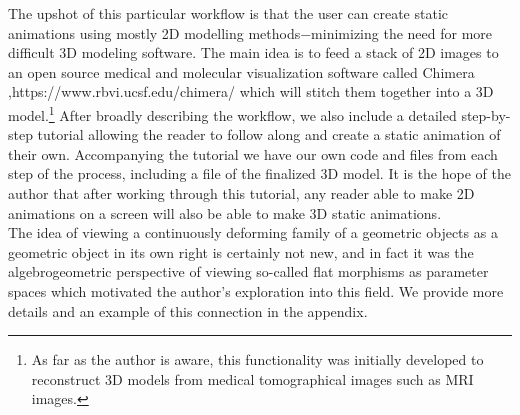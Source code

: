\documentclass[12 pt]{article}
\begin{document}
The upshot of this particular workflow is that the user can create static animations using mostly 2D modelling methods$-$minimizing the need for more difficult 3D modeling software.  The main idea is to feed a stack of 2D images to an open source medical and molecular visualization software called Chimera \cite{chimera},https://www.rbvi.ucsf.edu/chimera/ which will stitch them together into a 3D model.\footnote{As far as the author is aware, this functionality was initially developed to reconstruct 3D models from medical tomographical images such as MRI images.}  After broadly describing the workflow, we also include a detailed step-by-step tutorial allowing the reader to follow along and create a static animation of their own.  Accompanying the tutorial we have our own code and files from each step of the process, including a file of the finalized 3D model.  It is the hope of the author that after working through this tutorial, any reader able to make 2D animations on a screen will also be able to make 3D static animations.\\

The idea of viewing a continuously deforming family of a geometric objects as a geometric object in its own right is certainly not new, and in fact it was the algebrogeometric perspective of viewing so-called flat morphisms as parameter spaces which motivated the author's exploration into this field.  We provide more details and an example of this connection in the appendix.
\end{document}
